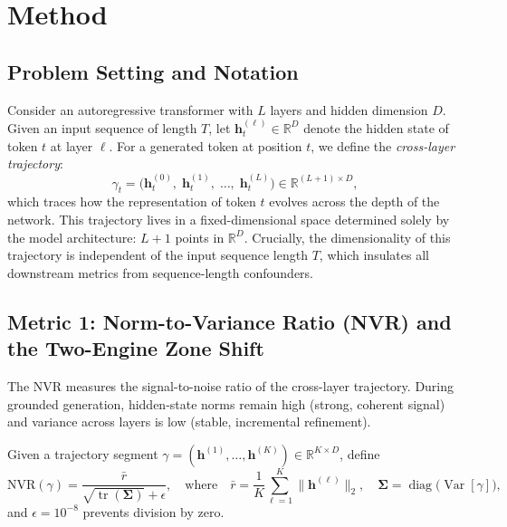\documentclass[10pt]{article}
\newcommand{\nvr}{\text{NVR}}
\newcommand{\R}{\mathbb{R}}
\begin{document}
\section{Method}
\label{sec:method}

\subsection{Problem Setting and Notation}
\label{sec:setting}

Consider an autoregressive transformer with $L$ layers and hidden dimension $D$.
Given an input sequence of length $T$, let $\mathbf{h}_t^{(\ell)} \in \R^D$ denote the hidden state of token $t$ at layer $\ell$.
For a generated token at position $t$, we define the \emph{cross-layer trajectory}:
\begin{equation}
    \gamma_t = \bigl(\mathbf{h}_t^{(0)},\; \mathbf{h}_t^{(1)},\; \ldots,\; \mathbf{h}_t^{(L)}\bigr) \in \R^{(L+1) \times D},
    \label{eq:trajectory}
\end{equation}
which traces how the representation of token $t$ evolves across the depth of the network.
This trajectory lives in a fixed-dimensional space determined solely by the model architecture: $L+1$ points in $\R^D$.
Crucially, the dimensionality of this trajectory is independent of the input sequence length $T$, which insulates all downstream metrics from sequence-length confounders.

\subsection{Metric 1: Norm-to-Variance Ratio (NVR) and the Two-Engine Zone Shift}
\label{sec:nvr}

The NVR measures the signal-to-noise ratio of the cross-layer trajectory.
During grounded generation, hidden-state norms remain high (strong, coherent signal) and variance across layers is low (stable, incremental refinement).

\begin{definition}
Given a trajectory segment $\gamma = (\mathbf{h}^{(1)}, \ldots, \mathbf{h}^{(K)}) \in \R^{K \times D}$, define
\begin{equation}
    \nvr(\gamma) = \frac{\bar{r}}{\sqrt{\operatorname{tr}(\mathbf{\Sigma})} + \epsilon},
    \quad \text{where} \quad
    \bar{r} = \frac{1}{K}\sum_{\ell=1}^{K} \|\mathbf{h}^{(\ell)}\|_2,
    \quad
    \mathbf{\Sigma} = \operatorname{diag}\!\bigl(\operatorname{Var}[\gamma]\bigr),
\end{equation}
and $\epsilon = 10^{-8}$ prevents division by zero.
\end{definition}
\end{document}
